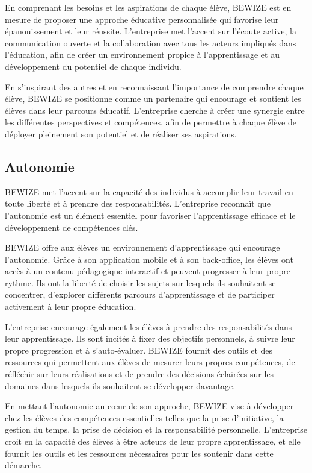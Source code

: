 En comprenant les besoins et les aspirations de chaque élève, BEWIZE est en mesure de proposer une approche éducative personnalisée qui favorise leur épanouissement et leur réussite. L'entreprise met l'accent sur l'écoute active, la communication ouverte et la collaboration avec tous les acteurs impliqués dans l'éducation, afin de créer un environnement propice à l'apprentissage et au développement du potentiel de chaque individu.

En s'inspirant des autres et en reconnaissant l'importance de comprendre chaque élève, BEWIZE se positionne comme un partenaire qui encourage et soutient les élèves dans leur parcours éducatif. L'entreprise cherche à créer une synergie entre les différentes perspectives et compétences, afin de permettre à chaque élève de déployer pleinement son potentiel et de réaliser ses aspirations.

\subsection{Autonomie} 
BEWIZE met l'accent sur la capacité des individus à accomplir leur travail en toute liberté et à prendre des responsabilités. L'entreprise reconnaît que l'autonomie est un élément essentiel pour favoriser l'apprentissage efficace et le développement de compétences clés.

BEWIZE offre aux élèves un environnement d'apprentissage qui encourage l'autonomie. Grâce à son application mobile et à son back-office, les élèves ont accès à un contenu pédagogique interactif et peuvent progresser à leur propre rythme. Ils ont la liberté de choisir les sujets sur lesquels ils souhaitent se concentrer, d'explorer différents parcours d'apprentissage et de participer activement à leur propre éducation.

L'entreprise encourage également les élèves à prendre des responsabilités dans leur apprentissage. Ils sont incités à fixer des objectifs personnels, à suivre leur propre progression et à s'auto-évaluer. BEWIZE fournit des outils et des ressources qui permettent aux élèves de mesurer leurs propres compétences, de réfléchir sur leurs réalisations et de prendre des décisions éclairées sur les domaines dans lesquels ils souhaitent se développer davantage.

En mettant l'autonomie au cœur de son approche, BEWIZE vise à développer chez les élèves des compétences essentielles telles que la prise d'initiative, la gestion du temps, la prise de décision et la responsabilité personnelle. L'entreprise croit en la capacité des élèves à être acteurs de leur propre apprentissage, et elle fournit les outils et les ressources nécessaires pour les soutenir dans cette démarche.


